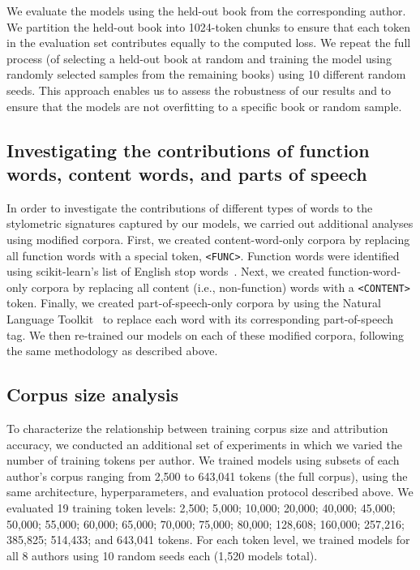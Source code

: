 \documentclass[11pt]{article}
\begin{document}
We evaluate the models using the held-out book from the corresponding author.
We partition the held-out book into 1024-token chunks to ensure that each token
in the evaluation set contributes equally to the computed loss. We repeat the
full process (of selecting a held-out book at random and training the model
using randomly selected samples from the remaining books) using 10 different
random seeds. This approach enables us to assess the robustness of our results
and to ensure that the models are not overfitting to a specific book or random
sample.

\subsection{Investigating the contributions of function words, content
words, and parts of speech \label{subsec:ablation}}

In order to investigate the contributions of different types of words to the
stylometric signatures captured by our models, we carried out additional
analyses using modified corpora. First, we created content-word-only corpora by
replacing all function words with a special token, \texttt{<FUNC>}. Function
words were identified using scikit-learn's list of English stop
words~\citep{PedrEtal11}. Next, we created function-word-only corpora by
replacing all content (i.e., non-function) words with a \texttt{<CONTENT>}
token. Finally, we created part-of-speech-only corpora by using the Natural
Language Toolkit~\citep[NLTK; ][]{BirdLope04} to replace each word with its
corresponding part-of-speech tag. We then re-trained our models on each of
these modified corpora, following the same methodology as described above.

\subsection{Corpus size analysis\label{subsec:data-requirements}}

To characterize the relationship between training corpus size and attribution
accuracy, we conducted an additional set of experiments in which we varied the
number of training tokens per author. We trained models using subsets of each
author's corpus ranging from 2,500 to 643,041 tokens (the full corpus), using
the same architecture, hyperparameters, and evaluation protocol described
above. We evaluated 19 training token levels: 2,500; 5,000; 10,000; 20,000;
40,000; 45,000; 50,000; 55,000; 60,000; 65,000; 70,000; 75,000; 80,000;
128,608; 160,000; 257,216; 385,825; 514,433; and 643,041 tokens. For each
token level, we trained models for all 8 authors using 10 random seeds each
(1,520 models total).
\end{document}
